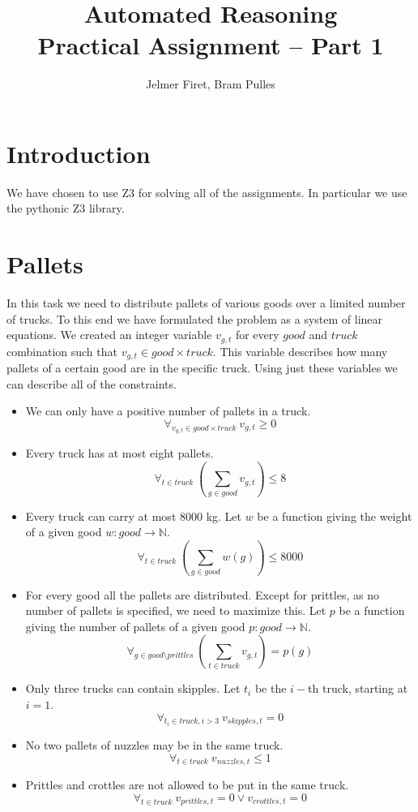 \documentclass[a4paper]{article}
\author{Jelmer Firet, Bram Pulles}
\title{\textbf{Automated Reasoning\\Practical Assignment -- Part 1}}
\begin{document}
\maketitle

\section{Introduction}
We have chosen to use Z3 for solving all of the assignments. In particular we
use the pythonic Z3 library.

\section{Pallets}
In this task we need to distribute pallets of various goods over a limited
number of trucks. To this end we have formulated the problem as a system of
linear equations. We created an integer variable $v_{g,t}$ for every $good$ and
$truck$ combination such that $v_{g,t} \in good \times truck$. This variable
describes how many pallets of a certain good are in the specific truck. Using
just these variables we can describe all of the constraints.

\begin{itemize}
	\item
		We can only have a positive number of pallets in a truck.
		\[ \forall_{v_{g,t} \in good \times truck}\ v_{g,t} \geq 0 \]
	\item
		Every truck has at most eight pallets.
		\[ \forall_{t \in truck}\ \left( \sum_{g \in good} v_{g,t} \right) \leq 8 \]
	\item
		Every truck can carry at most 8000 kg. Let $w$ be a function giving the
		weight of a given good $w: good \to \mathbb{N}$.
		\[ \forall_{t \in truck}\ \left( \sum_{g \in good} w(g) \right) \leq 8000 \]
	\item
		For every good all the pallets are distributed. Except for prittles, as
		no number of pallets is specified, we need to maximize this. Let $p$ be
		a function giving the number of pallets of a given good $p: good \to
		\mathbb{N}$.
		\[
		\forall_{g \in good \setminus prittles}\
		\left( \sum_{t \in truck} v_{g,t} \right) = p(g)
		\]
	\item
		Only three trucks can contain skipples. Let $t_i$ be the $i-$th truck,
		starting at $i = 1$.
		\[ \forall_{t_i \in truck, i > 3 }\ v_{skipples,t} = 0 \]
	\item
		No two pallets of nuzzles may be in the same truck.
		\[ \forall_{t \in truck}\ v_{nuzzles,t} \leq 1 \]
	\item
		Prittles and crottles are not allowed to be put in the same truck.
		\[ \forall_{t \in truck}\ v_{prittles,t} = 0 \lor v_{crottles,t} = 0 \]
\end{itemize}
\end{document}

